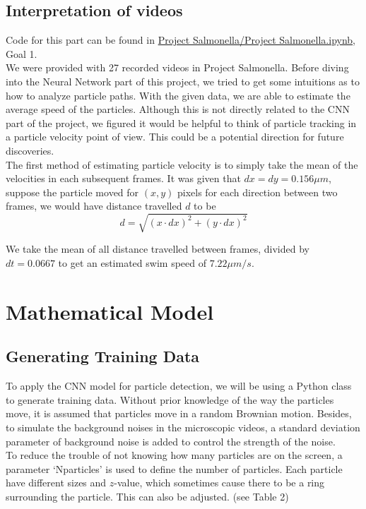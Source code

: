 \documentclass[11pt,a4paper]{scrartcl}
\begin{document}
\subsection{Interpretation of videos}
Code for this part can be found in \url{Project Salmonella/Project Salmonella.ipynb}, Goal 1.\\

We were provided with 27 recorded videos in Project Salmonella. Before diving into the Neural Network part of this project, we tried to get some intuitions as to how to analyze particle paths. With the given data, we are able to estimate the average speed of the particles. Although this is not directly related to the CNN part of the project, we figured it would be helpful to think of particle tracking in a particle velocity point of view. This could be a potential direction for future discoveries.\\

The first method of estimating particle velocity is to simply take the mean of the velocities in each subsequent frames. It was given that $dx = dy = 0.156 \mu m$, suppose the particle moved for $(x,y)$ pixels for each direction between two frames, we would have distance travelled $d$ to be 
$$d = \sqrt{(x\cdot dx)^2 + (y\cdot dx)^2}$$

We take the mean of all distance travelled between frames, divided by $dt = 0.0667$ to get an estimated swim speed of $7.22 \mu m/s$.


\section{Mathematical Model}

\subsection{Generating Training Data}
To apply the CNN model for particle detection, we will be using a Python class to generate training data. Without prior knowledge of the way the particles move, it is assumed that particles move in a random Brownian motion. Besides, to simulate the background noises in the microscopic videos, a standard deviation parameter of background noise is added to control the strength of the noise.\\

To reduce the trouble of not knowing how many particles are on the screen, a parameter `Nparticles' is used to define the number of particles. Each particle have different sizes and $z$-value, which sometimes cause there to be a ring surrounding the particle. This can also be adjusted. (see Table 2)
\end{document}
